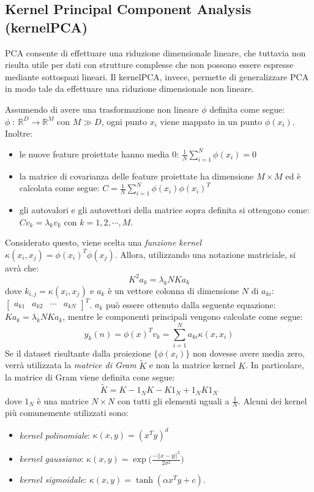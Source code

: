 \documentclass[11pt,a4paper,twocolumn]{article}
\begin{document}
\subsection{Kernel Principal Component Analysis (kernelPCA)}
PCA consente di effettuare una riduzione dimensionale lineare, che tuttavia non risulta utile per dati con strutture complesse che non possono essere espresse mediante sottospazi lineari. Il kernelPCA, invece, permette di generalizzare PCA in modo tale da effettuare una riduzione dimensionale non lineare. \par
Assumendo di avere una trasformazione non lineare $\phi$ definita come segue: $\phi \;: \: \mathbb{R}^D \rightarrow  \mathbb{R}^M $ con $ M \gg D $, ogni punto $ x_i $ viene mappato in un punto $ \phi(x_i) $. Inoltre:
\begin{itemize}
\item le nuove feature proiettate hanno media 0: $ \frac{1}{N}\sum_{i=1}^N{\phi(x_i)}=0$
\item la matrice di covarianza delle feature proiettate ha dimensione $ M \times M $ ed è calcolata come segue: $ C=\frac{1}{N}\sum_{i=1}^N{\phi(x_i)\phi(x_i)^T} $
\item gli autovalori e gli autovettori della matrice sopra definita si ottengono come: $ Cv_k=\lambda_k v_k $ con $k=1,2,\cdots,M$.
\end{itemize}
Considerato questo, viene scelta una \emph{funzione kernel} $ \kappa(x_i,x_j)=\phi(x_i)^T\phi(x_j) $. Allora, utilizzando una notazione matriciale, si avrà che:
\begin{equation}
\nonumber
K^2a_k=\lambda_kNKa_k
\end{equation}
dove $ k_{i,j}=\kappa(x_i,x_j) $ e $a_k$ è un vettore colonna di dimensione $N$ di $a_{ki}$: $\begin{bmatrix}
a_{k1}& a_{k2} & \cdots & a_{kN}
\end{bmatrix} ^T$.
$a_k$ può essere ottenuto dalla seguente equazione: $ Ka_k=\lambda_kNKa_k$, mentre le componenti principali vengono calcolate come segue:
\begin{equation}
\nonumber
y_k(n)=\phi(x)^Tv_k=\sum_{i=1}^N{a_{ki}}\kappa(x,x_i)
\end{equation}
Se il dataset risultante dalla proiezione $\{\phi(x_i)\}$ non dovesse avere media zero, verrà utilizzata la \emph{matrice di Gram} $\tilde{K}$ e non la matrice kernel $K$. In particolare, la matrice di Gram viene definita cone segue:
\begin{equation}
\nonumber
\tilde{K}=K-1_NK-K1_N+1_NK1_N
\end{equation}
dove $1_N$ è una matrice $N \times N$ con tutti gli elementi uguali a $ \frac{1}{N}$.
Alcuni dei kernel più comunemente utilizzati sono:
\begin{itemize}
\item \emph{kernel polinomiale}: $ \kappa(x,y)=(x^Ty)^d $
\item \emph{kernel gaussiano}: $ \kappa(x,y)=\exp{\biggl(\frac{- \lvert \lvert {x-y} \lvert \lvert ^2}{2 \sigma^2}\biggr)} $
\item \emph{kernel sigmoidale}: $\kappa(x,y)=\tanh{(\alpha x^Ty+c)}$.
\end{itemize}
\end{document}
